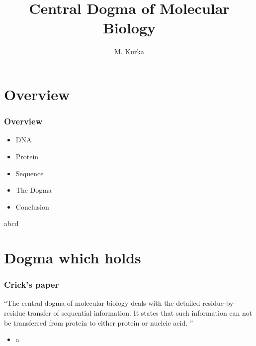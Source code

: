 \documentclass{beamer}
\title{Central Dogma of Molecular Biology}
\author{M. Kurka}
\begin{document}
\maketitle

\section{Overview}
\begin{frame}
    \frametitle{Overview}
    \begin{itemize}
        \item DNA
        \item Protein
        \item Sequence
        \item The Dogma
        \item Conclusion
    \end{itemize}
\end{frame}
\begin{frame}
    abcd
\end{frame}
\section{Dogma which holds}
\begin{frame}
\frametitle{Crick's paper}
\begin{exampleblock}{}
    {\large ``The central dogma of molecular biology deals with the detailed
    residue-by-residue transfer of sequential information. It states
    that such information can not be transferred from protein to either
    protein or nucleic acid. ''}
    \vskip5mm
    \hspace*{}\footnotemark[1]\
\end{exampleblock}
\begin{itemize}
    \item a
\end{itemize}
\end{frame}
\end{document}
